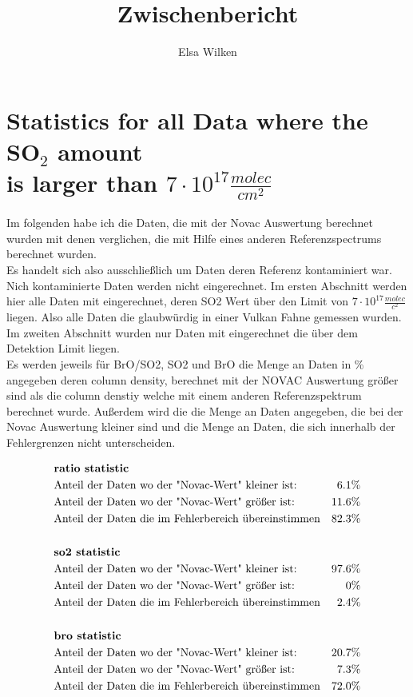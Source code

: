 \documentclass[]{article}
\title{Zwischenbericht}
\author{Elsa Wilken}
\begin{document}
\maketitle



\section*{Statistics for all Data where the SO$_2$ amount\\ is larger than $7\cdot 10^{17}\frac{molec}{cm^ 2}$}
Im folgenden habe ich die Daten, die mit der Novac Auswertung berechnet wurden mit denen verglichen, die mit Hilfe eines anderen Referenzspectrums berechnet wurden.\\
Es handelt sich also ausschließlich um Daten deren Referenz kontaminiert war. Nich kontaminierte Daten werden nicht eingerechnet.
Im ersten Abschnitt werden hier alle Daten mit eingerechnet, deren SO2 Wert über den Limit von $7\cdot 10^{17}\frac{molec}{c^{2}}$ liegen. Also alle Daten die glaubwürdig in einer Vulkan Fahne gemessen wurden.\\
Im zweiten Abschnitt wurden nur Daten mit eingerechnet die über dem Detektion Limit liegen.\\
%
\newline
%
Es werden jeweils für BrO/SO2, SO2 und BrO die Menge an Daten in \% angegeben deren column density, berechnet mit der NOVAC Auswertung größer sind als die column denstiy welche mit einem anderen Referenzspektrum berechnet wurde. Außerdem wird die die Menge an Daten angegeben, die bei der Novac Auswertung kleiner sind und die Menge an Daten, die sich innerhalb der Fehlergrenzen nicht unterscheiden.

\begin{align*}
& \textbf{\text{ratio statistic}}\\
& \text{Anteil der Daten wo der "Novac-Wert" kleiner ist:} &  6.1\%\\
& \text{Anteil der Daten wo der "Novac-Wert" größer ist:}&  11.6\%\\
& \text{Anteil der Daten die im Fehlerbereich übereinstimmen} &  82.3\%\\
\\
& \textbf{\text{so2 statistic}}\\
&  \text{Anteil der Daten wo der "Novac-Wert" kleiner ist:}  &  97.6\% \\
& \text{Anteil der Daten wo der "Novac-Wert" größer ist:}&  0\%\\
& \text{Anteil der Daten die im Fehlerbereich übereinstimmen}&  2.4\%\\
\\
& \textbf{\text{bro statistic}}\\
& \text{Anteil der Daten wo der "Novac-Wert" kleiner ist:}  &  20.7 \%\\
& \text{Anteil der Daten wo der "Novac-Wert" größer ist:} &  7.3\%\\
& \text{Anteil der Daten die im Fehlerbereich übereinstimmen} &  72.0\%\\
\end{align*}
\end{document}
